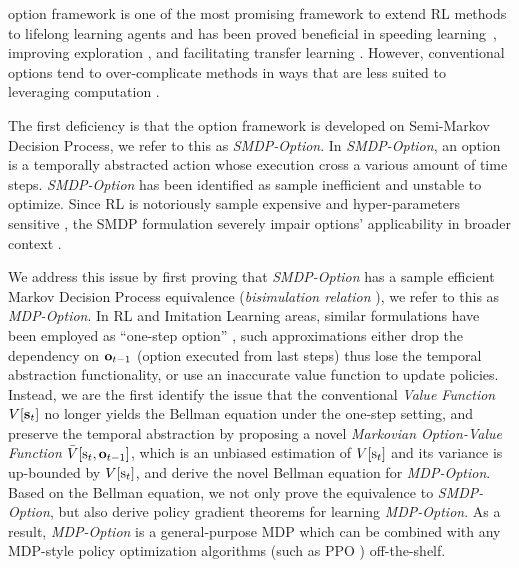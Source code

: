 \documentclass[10pt,journal,compsoc]{IEEEtran}
\renewcommand{\cite}{\citep}
\begin{document}
 option framework \cite{sutton1999between} is
one of the most promising framework to extend RL methods to
lifelong learning agents \cite{mankowitz2016adaptive} and has
been proved beneficial in speeding
learning~\cite{bacon2018temporal}, improving exploration
\cite{harb2018waiting}, and facilitating transfer learning
\cite{zhang2019dac}. However, conventional options tend to
over-complicate methods in ways that are less suited to
leveraging computation \cite{bacon2018temporal}.

The first deficiency is that the option framework is developed on
Semi-Markov Decision Process, we refer to this as
\emph{SMDP-Option}. In \emph{SMDP-Option}, an option is a
temporally abstracted action whose execution cross a various
amount of time steps. \emph{SMDP-Option} has been identified
\cite{zhang2019dac} as sample inefficient and unstable to
optimize. Since RL is notoriously sample expensive and
hyper-parameters sensitive \cite{haarnoja2018soft}, the SMDP
formulation severely impair options' applicability in broader
context \cite{jong2008utility}.

We address this issue by first proving that \emph{SMDP-Option}
has a sample efficient Markov Decision Process equivalence
(\emph{bisimulation relation} \cite{givan2003equivalence}), we
refer to this as \emph{MDP-Option}. In RL
\cite{levy2011unified,zhang2019dac} and Imitation Learning
\cite{henderson2018optiongan,sharma2018directed,shankar2020learning,lee2020learning}
areas, similar formulations have been employed as ``one-step
option'' \cite{henderson2018optiongan,zhang2019dac}, such
approximations either drop the dependency on ${\mathbf{o}}_{t-1}$ (option
executed from last steps) thus lose the temporal abstraction
functionality, or use an inaccurate value function to update
policies. Instead, we are the first identify the issue that the
conventional \emph{Value Function} $V[{\mathbf{s}}_t]$ no longer yields
the Bellman equation \cite{sutton1999between} under the one-step
setting, and preserve the temporal abstraction by proposing a
novel \emph{Markovian Option-Value Function}
$\bar{V}[{\textnormal{s}}_t,{\mathbf{o}}_{t-1}]$, which is an unbiased estimation of
$V[{\textnormal{s}}_t]$ and its variance is up-bounded by $V[{\textnormal{s}}_t]$, and
derive the novel Bellman equation for \emph{MDP-Option}. Based on
the Bellman equation, we not only prove the equivalence to
\emph{SMDP-Option}, but also derive policy gradient theorems for
learning \emph{MDP-Option}. As a result, \emph{MDP-Option} is a
general-purpose MDP which can be combined with any MDP-style
\cite{zhang2019dac} policy optimization algorithms (such as PPO
\cite{witoonchart2017application}) off-the-shelf.
\end{document}
